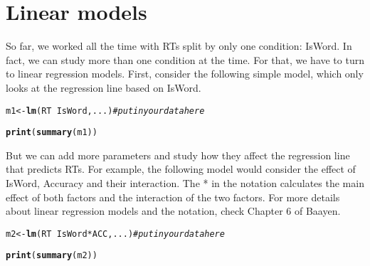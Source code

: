 \documentclass{article}\usepackage[]{graphicx}\usepackage[]{color}
\makeatletter
\newcommand{\hlcom}[1]{\textcolor[rgb]{0.678,0.584,0.686}{\textit{#1}}}%
\newcommand{\hlopt}[1]{\textcolor[rgb]{0,0,0}{#1}}%
\newcommand{\hlstd}[1]{\textcolor[rgb]{0.345,0.345,0.345}{#1}}%
\newcommand{\hlkwb}[1]{\textcolor[rgb]{0.69,0.353,0.396}{#1}}%
\newcommand{\hlkwd}[1]{\textcolor[rgb]{0.737,0.353,0.396}{\textbf{#1}}}%
\newenvironment{kframe}{%
 \def\at@end@of@kframe{}%
 \ifinner\ifhmode%
  \def\at@end@of@kframe{\end{minipage}}%
  \begin{minipage}{\columnwidth}%
 \fi\fi%
 \def\FrameCommand##1{\hskip\@totalleftmargin \hskip-\fboxsep
 \colorbox{shadecolor}{##1}\hskip-\fboxsep
     \hskip-\linewidth \hskip-\@totalleftmargin \hskip\columnwidth}%
 \MakeFramed {\advance\hsize-\width
   \@totalleftmargin\z@ \linewidth\hsize
   \@setminipage}}%
 {\par\unskip\endMakeFramed%
 \at@end@of@kframe}
\newenvironment{knitrout}{}{} %
\makeatother
\begin{document}
\section{Linear models}

So far, we worked all the time with RTs split by only one condition: IsWord. In fact, we can study more than one condition at the time. For that, we have to turn to linear regression models. First, consider the following simple model, which only looks at the regression line based on IsWord.

\begin{knitrout}
\color{fgcolor}\begin{kframe}
\begin{alltt}
\hlstd{m1} \hlkwb{<-} \hlkwd{lm}\hlstd{(RT} \hlopt{~} \hlstd{IsWord, ...)}  \hlcom{#put in your data here}
\end{alltt}


{\ttfamily\noindent\bfseries\color{errorcolor}{\#\# Error in eval(expr, envir, enclos): '...' used in an incorrect context}}\begin{alltt}
\hlkwd{print}\hlstd{(}\hlkwd{summary}\hlstd{(m1))}
\end{alltt}


{\ttfamily\noindent\bfseries\color{errorcolor}{\#\# Error in summary(m1): object 'm1' not found}}\end{kframe}
\end{knitrout}

But we can add more parameters and study how they affect the regression line that predicts RTs. For example, the following model would consider the effect of IsWord, Accuracy and their interaction. The * in the notation calculates the main effect of both factors and the interaction of the two factors. For more details about linear regression models and the notation, check Chapter 6 of Baayen.

\begin{knitrout}
\color{fgcolor}\begin{kframe}
\begin{alltt}
\hlstd{m2} \hlkwb{<-} \hlkwd{lm}\hlstd{(RT} \hlopt{~} \hlstd{IsWord} \hlopt{*} \hlstd{ACC, ...)}  \hlcom{#put in your data here}
\end{alltt}


{\ttfamily\noindent\bfseries\color{errorcolor}{\#\# Error in eval(expr, envir, enclos): '...' used in an incorrect context}}\begin{alltt}
\hlkwd{print}\hlstd{(}\hlkwd{summary}\hlstd{(m2))}
\end{alltt}


{\ttfamily\noindent\bfseries\color{errorcolor}{\#\# Error in summary(m2): object 'm2' not found}}\end{kframe}
\end{knitrout}
\end{document}
